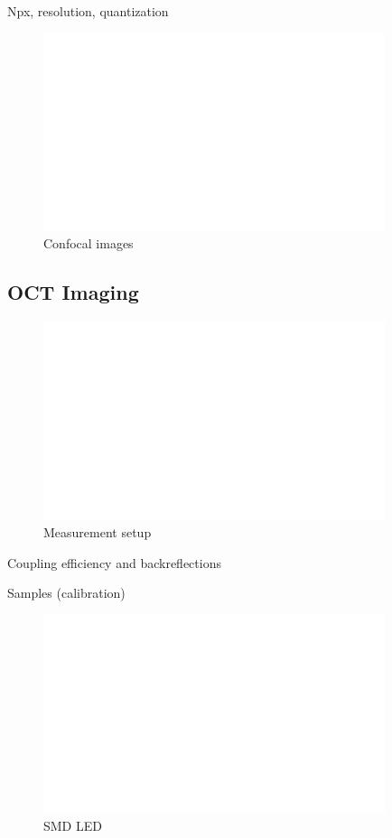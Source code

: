 Npx, resolution, quantization

\begin{figure}[h!]\centering \includegraphics[width=10cm,draft]{figures/foo.png}
      \caption{Confocal images}
\end{figure}


\clearpage
\subsection{OCT Imaging}
\begin{figure}[h!]\centering \includegraphics[width=10cm,draft]{figures/foo.png}
      \caption{Measurement setup}
\end{figure}

Coupling efficiency and backreflections

Samples (calibration)
\begin{figure}[h!]\centering \includegraphics[width=10cm,draft]{figures/foo.png}
      \caption{SMD LED}
\end{figure}

